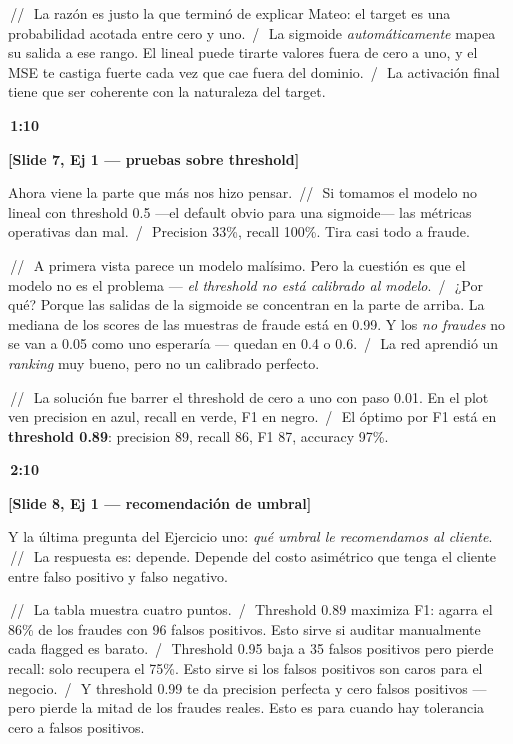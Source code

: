 \documentclass[11pt,a4paper]{article}
\newcommand{\slidenum}[1]{\textcolor{accent}{\textbf{[Slide #1]}}}
\newcommand{\timing}[1]{\textcolor{muted}{\textbf{\,#1\,}}}
\newcommand{\pausa}{\textcolor{muted}{\,/\,}}
\newcommand{\Pausa}{\textcolor{muted}{\,/\!/\,}}
\begin{document}
\Pausa\ La razón es justo la que terminó de explicar Mateo: el target es una probabilidad acotada entre cero y uno. \pausa\ La sigmoide \emph{automáticamente} mapea su salida a ese rango. El lineal puede tirarte valores fuera de cero a uno, y el MSE te castiga fuerte cada vez que cae fuera del dominio. \pausa\ La activación final tiene que ser coherente con la naturaleza del target.

\timing{1:10}

\slidenum{7, Ej 1 — pruebas sobre threshold}

Ahora viene la parte que más nos hizo pensar. \Pausa\ Si tomamos el modelo no lineal con threshold 0.5 ---el default obvio para una sigmoide--- las métricas operativas dan mal. \pausa\ Precision 33\%, recall 100\%. Tira casi todo a fraude.

\Pausa\ A primera vista parece un modelo malísimo. Pero la cuestión es que el modelo no es el problema --- \emph{el threshold no está calibrado al modelo}. \pausa\ ¿Por qué? Porque las salidas de la sigmoide se concentran en la parte de arriba. La mediana de los scores de las muestras de fraude está en 0.99. Y los \emph{no fraudes} no se van a 0.05 como uno esperaría --- quedan en 0.4 o 0.6. \pausa\ La red aprendió un \emph{ranking} muy bueno, pero no un calibrado perfecto.

\Pausa\ La solución fue barrer el threshold de cero a uno con paso 0.01. En el plot ven precision en azul, recall en verde, F1 en negro. \pausa\ El óptimo por F1 está en \textbf{threshold 0.89}: precision 89, recall 86, F1 87, accuracy 97\%.

\timing{2:10}

\slidenum{8, Ej 1 — recomendación de umbral}

Y la última pregunta del Ejercicio uno: \emph{qué umbral le recomendamos al cliente}. \Pausa\ La respuesta es: depende. Depende del costo asimétrico que tenga el cliente entre falso positivo y falso negativo.

\Pausa\ La tabla muestra cuatro puntos. \pausa\ Threshold 0.89 maximiza F1: agarra el 86\% de los fraudes con 96 falsos positivos. Esto sirve si auditar manualmente cada flagged es barato. \pausa\ Threshold 0.95 baja a 35 falsos positivos pero pierde recall: solo recupera el 75\%. Esto sirve si los falsos positivos son caros para el negocio. \pausa\ Y threshold 0.99 te da precision perfecta y cero falsos positivos --- pero pierde la mitad de los fraudes reales. Esto es para cuando hay tolerancia cero a falsos positivos.
\end{document}
